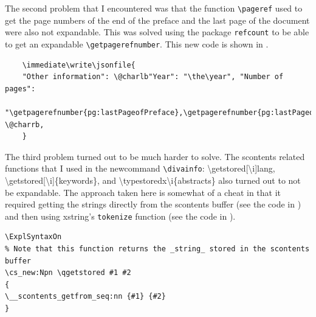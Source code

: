The second problem that I encountered was that the function \texttt{\textbackslash pageref} used to get the page numbers of the end of the preface and the last page of the document were also not expandable. This was solved using the package \texttt{refcount} to be able to get an expandable \texttt{\textbackslash getpagerefnumber}. This new code is shown in .
\begin{lstlisting}[language={[LaTeX]TeX}, caption={New code to output the "Other information" including page numbers}, label=lst:newCodeToOutputPageNumbers]
    % "\pageref{pg:lastPageofPreface},\pageref{pg:lastPageofMainmatter}" \@charrb,
    \immediate\write\jsonfile{
    "Other information": \@charlb"Year": "\the\year", "Number of pages": 
    "\getpagerefnumber{pg:lastPageofPreface},\getpagerefnumber{pg:lastPageofMainmatter}" \@charrb,
    }
\end{lstlisting}

The third problem turned out to be much harder to solve. The scontents related functions that I used in the newcommand \texttt{\textbackslash divainfo}: \textbackslash getstored[\textbackslash i]{lang}, \textbackslash getstored[\textbackslash i]\{keywords\}, and \textbackslash typestoredx{\textbackslash i}\{abstracts\} also turned out to not be expandable. The approach taken here is somewhat of a cheat in that it required getting the strings directly from the scontents buffer (see the code in ) and then using xstring’s \texttt{tokenize}  function (see the code in ).
\begin{lstlisting}[language={[LaTeX]TeX}, caption={Function to get the scontents}, label=lst:functionToGetscontents]
\ExplSyntaxOn
% Note that this function returns the _string_ stored in the scontents buffer
\cs_new:Npn \qgetstored #1 #2
{
\__scontents_getfrom_seq:nn {#1} {#2}
}
\end{lstlisting}
	
